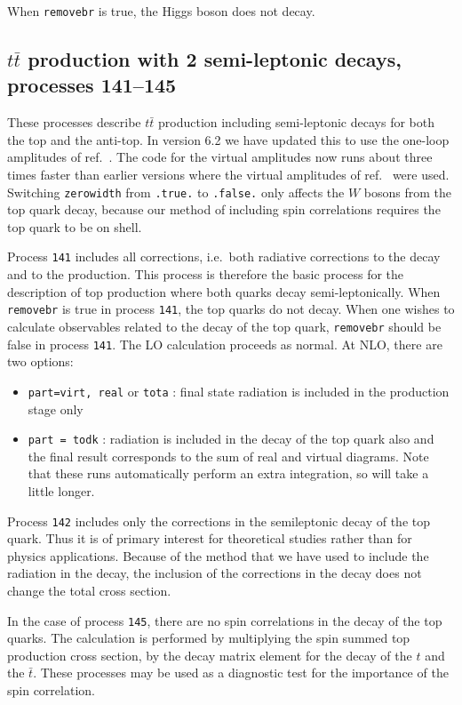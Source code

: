 \documentclass[12pt]{article}
\begin{document}
When {\tt removebr} is true, the Higgs boson does not decay.

\subsection{$t\bar{t}$ production with 2 semi-leptonic decays, processes 141--145}
\label{subsec:ttbar}

These processes describe $t \bar{t}$ production including semi-leptonic
decays for both the top and the anti-top. 
In version 6.2 we have updated this to use the one-loop amplitudes of
ref.~\cite{Badger:2011yu}. The code for the virtual amplitudes now runs
about three times faster than earlier versions where the virtual
amplitudes of ref.~\cite{Korner:2002hy} were used.  
Switching {\tt zerowidth} from {\tt .true.} to {\tt .false.} only affects 
the $W$ bosons from the top quark decay, because our method of including spin
correlations requires the top quark to be on shell.

Process {\tt 141} includes all corrections, i.e.\ both radiative corrections
to the decay and to the production. This process is therefore the
basic process for the description of top production where both quarks
decay semi-leptonically.  When {\tt removebr} is true in process {\tt 141},
the top quarks do not decay.
When one wishes to calculate observables related to the decay of the top
quark, {\tt removebr} should be false in process {\tt 141}.
The LO calculation proceeds as normal. 
At NLO, there are two options:
\begin{itemize}
\item {\tt part=virt, real} or {\tt tota} : final state radiation is included
in the production stage only
\item {\tt part = todk} : radiation is included in the decay of the top
quark also and the final result corresponds to the sum of real and virtual
diagrams. 
Note that these runs automatically perform an extra integration, so
will take a little longer.
\end{itemize}

Process {\tt 142} includes only the corrections in
the semileptonic decay of the top quark. Thus it is of primary
interest for theoretical studies rather than for physics applications.  
Because of the method that we have used to include the radiation in the decay,
the inclusion of the corrections in the decay does not change the
total cross section.


In the case of process {\tt 145}, there are no spin correlations in
the decay of the top quarks. The calculation is performed by
multiplying the spin summed top production cross section, by the decay
matrix element for the decay of the $t$ and the $\bar{t}$. These
processes may be used as a diagnostic test for the importance of the
spin correlation.
\end{document}
